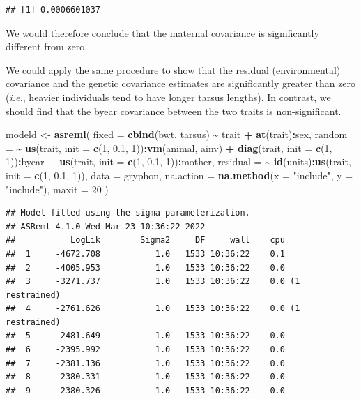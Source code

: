 \documentclass[
  12pt,
]{book}
\newenvironment{Shaded}{\begin{snugshade}}{\end{snugshade}}
\newcommand{\DataTypeTok}[1]{\textcolor[rgb]{0.13,0.29,0.53}{#1}}
\newcommand{\DecValTok}[1]{\textcolor[rgb]{0.00,0.00,0.81}{#1}}
\newcommand{\FloatTok}[1]{\textcolor[rgb]{0.00,0.00,0.81}{#1}}
\newcommand{\KeywordTok}[1]{\textcolor[rgb]{0.13,0.29,0.53}{\textbf{#1}}}
\newcommand{\NormalTok}[1]{#1}
\newcommand{\OperatorTok}[1]{\textcolor[rgb]{0.81,0.36,0.00}{\textbf{#1}}}
\newcommand{\StringTok}[1]{\textcolor[rgb]{0.31,0.60,0.02}{#1}}
\begin{document}
\begin{verbatim}
## [1] 0.0006601037
\end{verbatim}

We would therefore conclude that the maternal covariance is significantly different from zero.

We could apply the same procedure to show that the residual (environmental) covariance and the genetic covariance estimates are significantly greater than zero (\emph{i.e.}, heavier individuals tend to have longer tarsus lengths). In contrast, we should find that the byear covariance between the two traits is non-significant.

\begin{Shaded}
\begin{Highlighting}[]
\NormalTok{modeld \textless{}{-}}\StringTok{ }\KeywordTok{asreml}\NormalTok{(}
  \DataTypeTok{fixed =} \KeywordTok{cbind}\NormalTok{(bwt, tarsus) }\OperatorTok{\textasciitilde{}}\StringTok{ }\NormalTok{trait }\OperatorTok{+}\StringTok{ }\KeywordTok{at}\NormalTok{(trait)}\OperatorTok{:}\NormalTok{sex,}
  \DataTypeTok{random =} \OperatorTok{\textasciitilde{}}\StringTok{ }\KeywordTok{us}\NormalTok{(trait, }\DataTypeTok{init =} \KeywordTok{c}\NormalTok{(}\DecValTok{1}\NormalTok{, }\FloatTok{0.1}\NormalTok{, }\DecValTok{1}\NormalTok{))}\OperatorTok{:}\KeywordTok{vm}\NormalTok{(animal, ainv) }\OperatorTok{+}
\StringTok{    }\KeywordTok{diag}\NormalTok{(trait, }\DataTypeTok{init =} \KeywordTok{c}\NormalTok{(}\DecValTok{1}\NormalTok{, }\DecValTok{1}\NormalTok{))}\OperatorTok{:}\NormalTok{byear }\OperatorTok{+}
\StringTok{    }\KeywordTok{us}\NormalTok{(trait, }\DataTypeTok{init =} \KeywordTok{c}\NormalTok{(}\DecValTok{1}\NormalTok{, }\FloatTok{0.1}\NormalTok{, }\DecValTok{1}\NormalTok{))}\OperatorTok{:}\NormalTok{mother,}
  \DataTypeTok{residual =} \OperatorTok{\textasciitilde{}}\StringTok{ }\KeywordTok{id}\NormalTok{(units)}\OperatorTok{:}\KeywordTok{us}\NormalTok{(trait, }\DataTypeTok{init =} \KeywordTok{c}\NormalTok{(}\DecValTok{1}\NormalTok{, }\FloatTok{0.1}\NormalTok{, }\DecValTok{1}\NormalTok{)),}
  \DataTypeTok{data =}\NormalTok{ gryphon,}
  \DataTypeTok{na.action =} \KeywordTok{na.method}\NormalTok{(}\DataTypeTok{x =} \StringTok{"include"}\NormalTok{, }\DataTypeTok{y =} \StringTok{"include"}\NormalTok{),}
  \DataTypeTok{maxit =} \DecValTok{20}
\NormalTok{)}
\end{Highlighting}
\end{Shaded}

\begin{verbatim}
## Model fitted using the sigma parameterization.
## ASReml 4.1.0 Wed Mar 23 10:36:22 2022
##           LogLik        Sigma2     DF     wall    cpu
##  1     -4672.708           1.0   1533 10:36:22    0.1
##  2     -4005.953           1.0   1533 10:36:22    0.0
##  3     -3271.737           1.0   1533 10:36:22    0.0 (1 restrained)
##  4     -2761.626           1.0   1533 10:36:22    0.0 (1 restrained)
##  5     -2481.649           1.0   1533 10:36:22    0.0
##  6     -2395.992           1.0   1533 10:36:22    0.0
##  7     -2381.136           1.0   1533 10:36:22    0.0
##  8     -2380.331           1.0   1533 10:36:22    0.0
##  9     -2380.326           1.0   1533 10:36:22    0.0
\end{verbatim}
\end{document}
